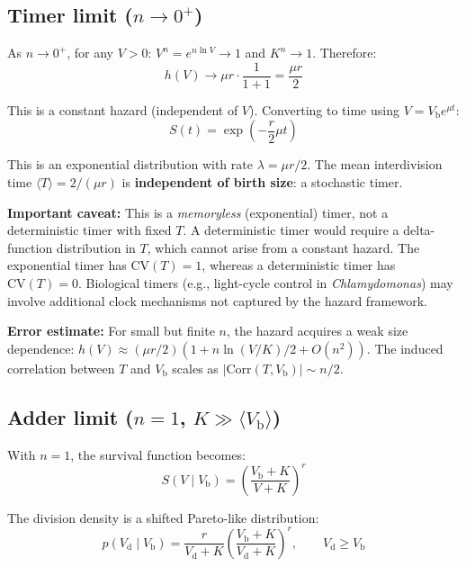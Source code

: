 \documentclass[11pt]{article}
\newcommand{\Vb}{V_{\mathrm{b}}}
\newcommand{\Vd}{V_{\mathrm{d}}}
\begin{document}
\subsection{Timer limit ($n \to 0^+$)}

As $n \to 0^+$, for any $V > 0$:
$V^n = e^{n \ln V} \to 1$ and $K^n \to 1$.
Therefore:
\begin{equation}
  h(V) \to \mu r \cdot \frac{1}{1+1} = \frac{\mu r}{2}
\end{equation}

This is a constant hazard (independent of $V$).  Converting to time
using $V = \Vb e^{\mu t}$:
\begin{equation}
  S(t) = \exp\left(-\frac{r}{2} \mu t\right)
\end{equation}

This is an exponential distribution with rate $\lambda = \mu r / 2$.
The mean interdivision time $\langle T \rangle = 2/(\mu r)$ is
\textbf{independent of birth size}: a stochastic timer.

\textbf{Important caveat:} This is a \emph{memoryless} (exponential)
timer, not a deterministic timer with fixed $T$.  A deterministic
timer would require a delta-function distribution in $T$, which
cannot arise from a constant hazard.  The exponential timer has
$\mathrm{CV}(T) = 1$, whereas a deterministic timer has
$\mathrm{CV}(T) = 0$.  Biological timers (e.g., light-cycle control
in \textit{Chlamydomonas}\cite{donnan1983}) may involve additional
clock mechanisms not captured by the hazard framework.

\textbf{Error estimate:} For small but finite $n$, the hazard acquires
a weak size dependence: $h(V) \approx (\mu r/2)(1 + n \ln(V/K)/2 +
O(n^2))$.  The induced correlation between $T$ and $\Vb$ scales as
$|\mathrm{Corr}(T, \Vb)| \sim n/2$.

\subsection{Adder limit ($n = 1$, $K \gg \langle\Vb\rangle$)}

With $n = 1$, the survival function becomes:
\begin{equation}
  S(V \mid \Vb) = \left(\frac{\Vb + K}{V + K}\right)^r
\end{equation}

The division density is a shifted Pareto-like distribution:
\begin{equation}
  p(\Vd \mid \Vb) = \frac{r}{\Vd + K}
    \left(\frac{\Vb + K}{\Vd + K}\right)^r, \qquad \Vd \geq \Vb
\end{equation}
\end{document}

